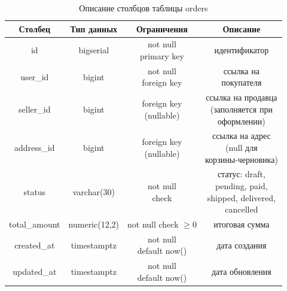 \begin{table}[H]
    \caption{Описание столбцов таблицы orders}
    \label{tbl:t_orders}
    \rpzcompacttable
    \begin{tabular}[]{|c|c|c|c|}
        \hline
        \textbf{Столбец} & \textbf{Тип данных} & \textbf{Ограничения} & \textbf{Описание} \\ \hline
        id & bigserial & \makecell{not null \\ primary key} & идентификатор \\ \hline
        user\_id & bigint & \makecell{not null \\ foreign key} & \makecell{ссылка на\\покупателя} \\ \hline
        seller\_id & bigint & \makecell{foreign key \\ (nullable)} & \makecell{ссылка на продавца\\(заполняется при\\оформлении)} \\ \hline
        address\_id & bigint & \makecell{foreign key \\ (nullable)} & \makecell{ссылка на адрес\\(null для\\корзины-черновика)} \\ \hline
        status & varchar(30) & \makecell{not null \\ check} & \makecell{статус: draft,\\pending, paid,\\shipped, delivered,\\cancelled} \\ \hline
        total\_amount & numeric(12,2) & \makecell{not null \\ check $\geq 0$} & итоговая сумма \\ \hline
        created\_at & timestamptz & \makecell{not null \\ default now()} & дата создания \\ \hline
        updated\_at & timestamptz & \makecell{not null \\ default now()} & дата обновления \\ \hline
    \end{tabular}
\end{table}

